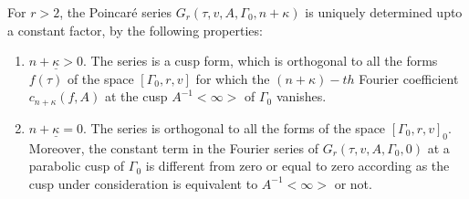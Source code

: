 \begin{thm}\label{chap3:thm23}
For $r>2$, the Poincar\'e series $G_r(\tau,v,A,\Gamma_0,n+\kappa)$ is
uniquely determined upto a constant factor, by the following properties:
\begin{enumerate}
\renewcommand{\theenumi}{\roman{enumi}}
\renewcommand{\labelenumi}{(\theenumi)}
\item $\underline{n+\kappa >0}$. \pageoriginale The series is a cusp
  form, which is orthogonal to all the forms $f(\tau)$ of the space
  $[\Gamma_0,r,v]$ for which the $(n+\kappa)-th$ Fourier coefficient
  $c_{n+\kappa}(f,A)$ at the cusp $A^{-1}<\infty>$ of $\Gamma_0$ vanishes.

\item $\underline{n+\kappa=0}$. The series is orthogonal to all the
  forms of the space $[\Gamma_0,r,v]_0$. Moreover, the constant term
  in the Fourier series of $G_r(\tau, v, A, \Gamma_0, 0)$ at a
  parabolic cusp of $\Gamma_0$ is different from zero or equal to zero
  according as the cusp under consideration is equivalent to
  $A^{-1}<\infty>$ or not.
\end{enumerate}
\end{thm}

